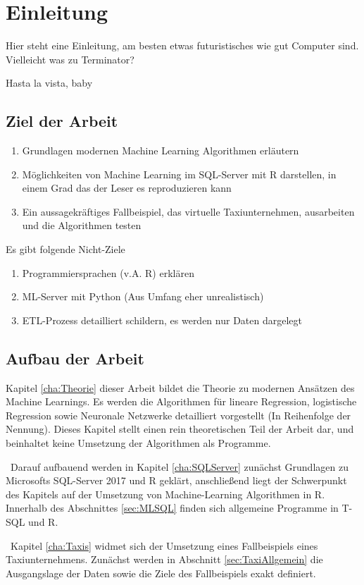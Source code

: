 \chapter{Einleitung}
\label{cha:Einleitung}
Hier steht eine Einleitung, am besten etwas futuristisches wie gut Computer sind. Vielleicht was zu Terminator? 

Hasta la vista, baby
\section{Ziel der Arbeit}
\label{sec:ZielDerArbeit}
\begin{enumerate}
	\item Grundlagen modernen Machine Learning Algorithmen erläutern
	\item Möglichkeiten von Machine Learning im SQL-Server mit R darstellen, in einem Grad das der Leser es reproduzieren kann
	\item Ein aussagekräftiges Fallbeispiel, das virtuelle Taxiunternehmen, ausarbeiten und die Algorithmen testen
\end{enumerate}
Es gibt folgende Nicht-Ziele
\begin{enumerate}
	\item Programmiersprachen (v.A. R) erklären
	\item ML-Server mit Python (Aus Umfang eher unrealistisch)
	\item ETL-Prozess detailliert schildern, es werden nur Daten dargelegt
\end{enumerate}
\section{Aufbau der Arbeit}
Kapitel \ref{cha:Theorie} dieser Arbeit bildet die Theorie zu modernen Ansätzen des Machine Learnings. Es werden die Algorithmen für lineare Regression, logistische Regression sowie Neuronale Netzwerke detailliert vorgestellt (In Reihenfolge der Nennung). Dieses Kapitel stellt einen rein theoretischen Teil der Arbeit dar, und beinhaltet keine Umsetzung der Algorithmen als Programme.

~\newline Darauf aufbauend  werden in Kapitel \ref{cha:SQLServer} zunächst Grundlagen zu Microsofts SQL-Server 2017 und R geklärt, anschließend liegt der Schwerpunkt des Kapitels auf der Umsetzung von Machine-Learning Algorithmen in R. Innerhalb des Abschnittes \ref{sec:MLSQL} finden sich allgemeine Programme in T-SQL und R.

~\newline Kapitel \ref{cha:Taxis} widmet sich der Umsetzung eines Fallbeispiels eines Taxiunternehmens. Zunächst werden in Abschnitt \ref{sec:TaxiAllgemein} die Ausgangslage der Daten sowie die Ziele des Fallbeispiels exakt definiert. 

